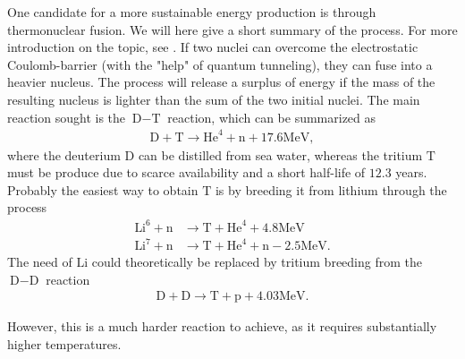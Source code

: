 One candidate for a more sustainable energy production is through thermonuclear fusion.
We will here give a short summary of the process.
For more introduction on the topic, see \cite{Freidberg2008book}.
If two nuclei can overcome the electrostatic Coulomb-barrier (with the "help" of quantum tunneling), they can fuse into a heavier nucleus.
The process will release a surplus of energy if the mass of the resulting nucleus is lighter than the sum of the two initial nuclei.
The main reaction sought is the $\text{D}-\text{T}$ reaction, which can be summarized as
%
\begin{align*}
    \text{D} + \text{T} \to \text{He}^4 + \text{n} + 17.6 \text{MeV},
\end{align*}
%
where the deuterium $\text{D}$ can be distilled from sea water, whereas the tritium $\text{T}$ must be produce due to scarce availability and a short half-life of $12.3$ years.
Probably the easiest way to obtain $\text{T}$ is by breeding it from lithium through the process
%
\begin{align*}
    \text{Li}^6 + \text{n} &\to \text{T} + \text{He}^4 + 4.8 \text{MeV}\\
    \text{Li}^7 + \text{n} &\to \text{T} + \text{He}^4 + \text{n} - 2.5 \text{MeV}.
\end{align*}
%
The need of $\text{Li}$ could theoretically be replaced by tritium breeding from the $\text{D}-\text{D}$ reaction
%
\begin{align*}
    \text{D} + \text{D} \to \text{T} + \text{p} + 4.03 \text{MeV}.
\end{align*}
%

However, this is a much harder reaction to achieve, as it requires substantially higher temperatures.

